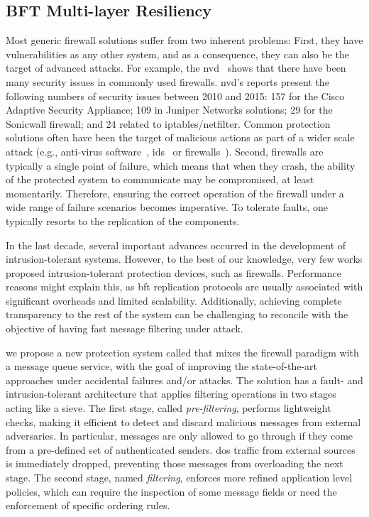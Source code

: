 \subsection{BFT Multi-layer Resiliency} 
Most generic firewall solutions suffer from two inherent problems: 
First, they have vulnerabilities as any other system, and as a consequence, they can also be the target of advanced attacks. 
For example, the \gls{nvd}~\cite{nvd} shows that there have been many security issues in commonly used firewalls. 
\gls{nvd}'s reports present the following numbers of security issues between 2010 and 2015: 157 for the Cisco Adaptive Security Appliance; 109 in Juniper Networks solutions; 29 for the Sonicwall firewall; and 24 related to iptables/netfilter. 
Common protection solutions often have been the target of malicious actions as part of a wider scale attack (e.g., anti-virus software~\cite{Chauhan:2011}, \gls{ids}~\cite{Anderson:2001} or firewalls~\cite{Kamara:2003,Surisetty:2010,cisco1,cisco2}).
Second, firewalls are typically a single point of failure, which means that when they crash, the ability of the protected system to communicate may be compromised, at least momentarily.
Therefore, ensuring the correct operation of the firewall under a wide range of failure scenarios becomes imperative.
To tolerate faults, one typically resorts to the replication of the components.

In the last decade, several important advances occurred in the development of intrusion-tolerant systems.
However, to the best of our knowledge, very few works proposed intrusion-tolerant protection devices, such as firewalls.
Performance reasons might explain this, as \gls{bft} replication protocols are usually associated with significant overheads and limited scalability.
Additionally, achieving complete transparency to the rest of the system can be challenging to reconcile with the objective of having fast message filtering under attack.


we propose a new protection system called \sieveq that mixes the firewall paradigm with a message queue service, with the goal of improving the state-of-the-art approaches under accidental failures and/or attacks.
The solution has a fault- and intrusion-tolerant architecture that applies filtering operations in two stages acting like a sieve.
The first stage, called \emph{pre-filtering}, performs lightweight checks, making it efficient to detect and discard malicious messages from external adversaries.
In particular, messages are only allowed to go through if they come from a pre-defined set of authenticated senders.
\gls{dos} traffic from external sources is immediately dropped, preventing those messages from overloading the next stage.
The second stage, named \emph{filtering}, enforces more refined application level policies, which can require the inspection of some message fields or need the enforcement of specific ordering rules.



